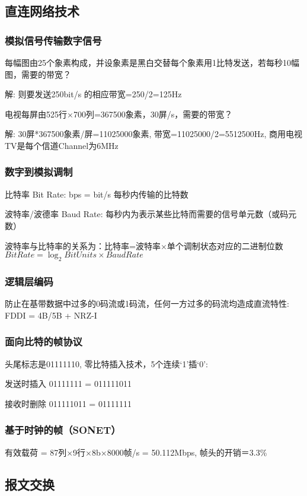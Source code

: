 \documentclass[UTF8,cs4size]{ctexart}
\begin{document}
\subsection{直连网络技术}
\subsubsection{模拟信号传输数字信号}
每幅图由25个象素构成，并设象素是黑白交替每个象素用1比特发送，若每秒10幅图，需要的带宽？

解: 则要发送250bit/s 的相应带宽=250/2=125Hz

电视每屏由525行×700列=367500象素，30屏/s，需要的带宽？

解: 30屏*367500象素/屏=11025000象素,
带宽=11025000/2=5512500Hz,
商用电视TV是每个信道Channel为6MHz
\subsubsection{数字到模拟调制}
\begin{compactitem}
  \item 比特率 Bit Rate: bps = bit/s 每秒内传输的比特数
  \item 波特率/波德率 Baud Rate: 每秒内为表示某些比特而需要的信号单元数（或码元数）
\end{compactitem}
波特率与比特率的关系为：比特率=波特率$\times$单个调制状态对应的二进制位数 $Bit Rate = \log_2{Bit Units} \times Baud Rate$
\subsubsection{逻辑层编码}
防止在基带数据中过多的0码流或1码流，任何一方过多的码流均造成直流特性: FDDI = 4B/5B + NRZ-I
\subsubsection{面向比特的帧协议}
头尾标志是01111110, 零比特插入技术，5个连续‘1’插‘0’:
\begin{compactitem}
  \item 发送时插入 01111111 = 011111011
  \item 接收时删除 011111011 = 01111111
\end{compactitem}
\subsubsection{基于时钟的帧（SONET）}
有效载荷 = 87列×9行×8b×8000帧/s = 50.112Mbps, 帧头的开销＝3.3\%

\subsection{报文交换}
\end{document}
